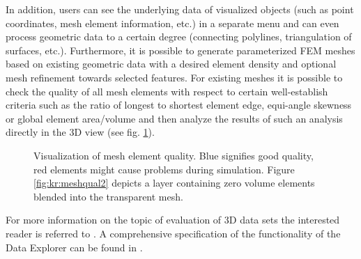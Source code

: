 In addition, users can see the underlying data of visualized objects (such as point coordinates, mesh element information, etc.) in a separate menu and can even process geometric data to a certain degree (connecting polylines, triangulation of surfaces, etc.). Furthermore, it is possible to generate parameterized FEM meshes based on existing geometric data with a desired element density and optional mesh refinement towards selected features. For existing meshes it is possible to check the quality of all mesh elements with respect to certain well-establish criteria such as the ratio of longest to shortest element edge, equi-angle skewness or global element area/volume and then analyze the results of such an analysis directly in the 3D view (see fig. \ref{fig:kr:meshqual}).

\begin{figure}[!b]
\begin{center}
\enspace
{}
\end{center}
\caption{Visualization of mesh element quality. Blue signifies good quality, red elements might cause problems during simulation. Figure \ref{fig:kr:meshqual2} depicts a layer containing zero volume elements blended into the transparent mesh.} \label{fig:kr:meshqual}
\end{figure}


For more information on the topic of evaluation of 3D data sets the interested reader is referred to \cite{rink:cgvcvip2011}. A comprehensive specification of the functionality of the \ogs Data Explorer can be found in %
\cite{rink:manual}.
